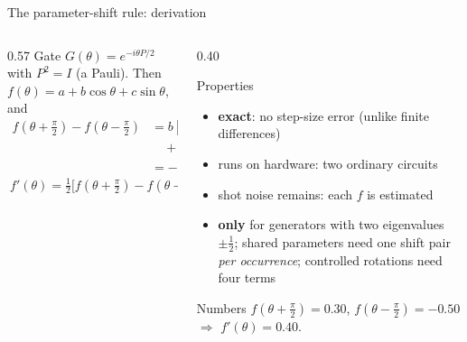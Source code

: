 \documentclass[aspectratio=169,11pt]{beamer}
\newcommand{\hl}[1]{{\color{qorange}\textbf{#1}}}
\newcommand{\key}[1]{{\color{qdark}\textbf{#1}}}
\begin{document}
\begin{frame}[label=fPSD]{The parameter-shift rule: derivation}
  \begin{columns}[T]
    \begin{column}{0.57\textwidth}
      \small
      Gate $G(\theta) = e^{-i\theta P/2}$ with $P^2 = I$ (a Pauli). Then $f(\theta) = a + b\cos\theta + c\sin\theta$, and
      \begin{align*}
        f(\theta + \tfrac\pi2) - f(\theta - \tfrac\pi2) &= b[\cos(\theta + \tfrac\pi2) - \cos(\theta - \tfrac\pi2)]\\
        &\quad + c[\sin(\theta + \tfrac\pi2) - \sin(\theta - \tfrac\pi2)]\\
        &= -2b\sin\theta + 2c\cos\theta = 2f'(\theta).
      \end{align*}
      \[ \boxed{\ f'(\theta) = \tfrac12\big[f(\theta + \tfrac\pi2) - f(\theta - \tfrac\pi2)\big]\ } \]
    \end{column}
    \begin{column}{0.40\textwidth}
      \begin{block}{Properties}
        \scriptsize
        \begin{itemize}\itemsep1pt
          \item \key{exact}: no step-size error (unlike finite differences)
          \item runs on hardware: two ordinary circuits
          \item shot noise remains: each $f$ is estimated
          \item \hl{only} for generators with two eigenvalues $\pm\frac12$; shared parameters need one shift pair \emph{per occurrence};
            controlled rotations need four terms
        \end{itemize}
      \end{block}
      \begin{exampleblock}{Numbers}
        \scriptsize $f(\theta + \frac\pi2) = 0.30$, $f(\theta - \frac\pi2) = -0.50$ $\Rightarrow$ $f'(\theta) = 0.40$.
      \end{exampleblock}
    \end{column}
  \end{columns}
\end{frame}
\end{document}
